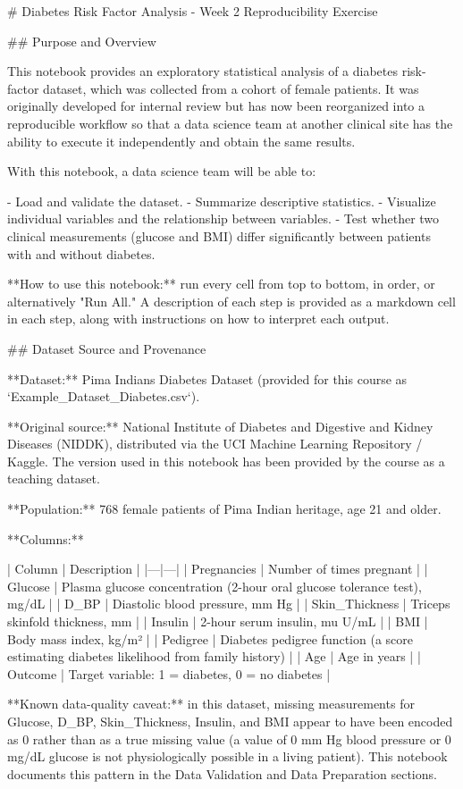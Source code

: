 # Diabetes Risk Factor Analysis - Week 2 Reproducibility Exercise

## Purpose and Overview

This notebook provides an exploratory statistical analysis of a diabetes
risk-factor dataset, which was collected from a cohort of female patients. It was
originally developed for internal review but has now been reorganized into a
reproducible workflow so that a data science team at another clinical site has the
ability to execute it independently and obtain the same results.

With this notebook, a data science team will be able to:

- Load and validate the dataset.
- Summarize descriptive statistics.
- Visualize individual variables and the relationship between variables.
- Test whether two clinical measurements (glucose and BMI) differ significantly
  between patients with and without diabetes.

**How to use this notebook:** run every cell from top to bottom, in order, or
alternatively "Run All." A description of each step is provided as a markdown
cell in each step, along with instructions on how to interpret each output.

## Dataset Source and Provenance

**Dataset:** Pima Indians Diabetes Dataset (provided for this course as
`Example_Dataset_Diabetes.csv`).

**Original source:** National Institute of Diabetes and Digestive and Kidney
Diseases (NIDDK), distributed via the UCI Machine Learning Repository / Kaggle.
The version used in this notebook has been provided by the course as a teaching
dataset.

**Population:** 768 female patients of Pima Indian heritage, age 21 and older.

**Columns:**

| Column | Description |
|---|---|
| Pregnancies | Number of times pregnant |
| Glucose | Plasma glucose concentration (2-hour oral glucose tolerance test), mg/dL |
| D_BP | Diastolic blood pressure, mm Hg |
| Skin_Thickness | Triceps skinfold thickness, mm |
| Insulin | 2-hour serum insulin, mu U/mL |
| BMI | Body mass index, kg/m² |
| Pedigree | Diabetes pedigree function (a score estimating diabetes likelihood from family history) |
| Age | Age in years |
| Outcome | Target variable: 1 = diabetes, 0 = no diabetes |

**Known data-quality caveat:** in this dataset, missing measurements for Glucose,
D_BP, Skin_Thickness, Insulin, and BMI appear to have been encoded as 0 rather
than as a true missing value (a value of 0 mm Hg blood pressure or 0 mg/dL glucose
is not physiologically possible in a living patient). This notebook documents this
pattern in the Data Validation and Data Preparation sections.

